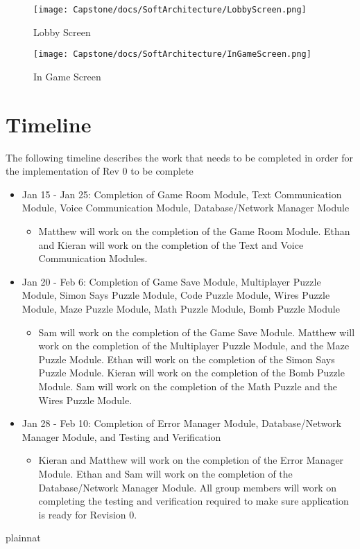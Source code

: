 \documentclass[12pt, titlepage]{article}
\begin{document}
\begin{figure}[H]
\centering
\texttt{[image: Capstone/docs/SoftArchitecture/LobbyScreen.png]}
\caption{Lobby Screen}
\label{FigUH}
\end{figure}


\begin{figure}[H]
\centering
\texttt{[image: Capstone/docs/SoftArchitecture/InGameScreen.png]}
\caption{In Game Screen}
\label{FigUH}
\end{figure}


\section{Timeline} \label{Rev0Timeline}
The following timeline describes the work that needs to be completed in order for the implementation of Rev 0 to be complete

\begin{itemize}
    \item Jan 15 - Jan 25:  Completion of Game Room Module, Text Communication Module, Voice Communication Module, Database/Network Manager Module
    \begin{itemize}
        \item     Matthew will work on the completion of the Game Room Module. Ethan and Kieran will work on the completion of the Text and Voice Communication Modules.
    \end{itemize}
    \item Jan 20 - Feb 6: Completion of Game Save Module, Multiplayer Puzzle Module, Simon Says Puzzle Module, Code Puzzle Module, Wires Puzzle Module, Maze Puzzle Module, Math Puzzle Module, Bomb Puzzle Module
    \begin{itemize}
        \item Sam will work on the completion of the Game Save Module. Matthew will work on the completion of the Multiplayer Puzzle Module, and the Maze Puzzle Module. Ethan will work on the completion of the Simon Says Puzzle Module. Kieran will work on the completion of the Bomb Puzzle Module. Sam will work on the completion of the Math Puzzle and the Wires Puzzle Module.
    \end{itemize}
    \item Jan 28 - Feb 10: Completion of Error Manager Module, Database/Network Manager Module, and Testing and Verification
    \begin{itemize}
        \item Kieran and Matthew will work on the completion of the Error Manager Module. Ethan and Sam will work on the completion of the Database/Network Manager Module. All group members will work on completing the testing and verification required to make sure application is ready for Revision 0.
    \end{itemize}

\end{itemize}

 {plainnat}


\newpage{}
\end{document}
